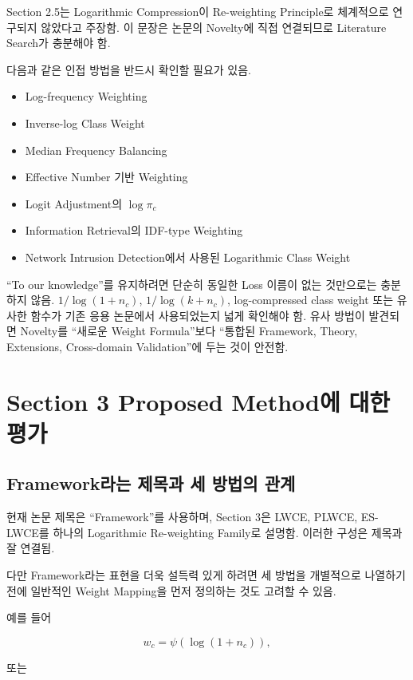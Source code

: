 \documentclass[11pt,a4paper]{article}
\begin{document}
Section 2.5는 Logarithmic Compression이 Re-weighting Principle로 체계적으로 연구되지 않았다고 주장함. 이 문장은 논문의 Novelty에 직접 연결되므로 Literature Search가 충분해야 함.

다음과 같은 인접 방법을 반드시 확인할 필요가 있음.

\begin{itemize}
\item Log-frequency Weighting
\item Inverse-log Class Weight
\item Median Frequency Balancing
\item Effective Number 기반 Weighting
\item Logit Adjustment의 \(\log \pi_c\)
\item Information Retrieval의 IDF-type Weighting
\item Network Intrusion Detection에서 사용된 Logarithmic Class Weight
\end{itemize}

\begin{tcolorbox}[title=중요]
``To our knowledge''를 유지하려면 단순히 동일한 Loss 이름이 없는 것만으로는 충분하지 않음. \(1/\log(1+n_c)\), \(1/\log(k+n_c)\), log-compressed class weight 또는 유사한 함수가 기존 응용 논문에서 사용되었는지 넓게 확인해야 함. 유사 방법이 발견되면 Novelty를 ``새로운 Weight Formula''보다 ``통합된 Framework, Theory, Extensions, Cross-domain Validation''에 두는 것이 안전함.
\end{tcolorbox}

\section{Section 3 Proposed Method에 대한 평가}

\subsection{Framework라는 제목과 세 방법의 관계}

현재 논문 제목은 ``Framework''를 사용하며, Section 3은 LWCE, PLWCE, ES-LWCE를 하나의 Logarithmic Re-weighting Family로 설명함. 이러한 구성은 제목과 잘 연결됨.

다만 Framework라는 표현을 더욱 설득력 있게 하려면 세 방법을 개별적으로 나열하기 전에 일반적인 Weight Mapping을 먼저 정의하는 것도 고려할 수 있음.

예를 들어

\[
w_c
=
\psi\!\left(\log(1+n_c)\right),
\]

또는
\end{document}
